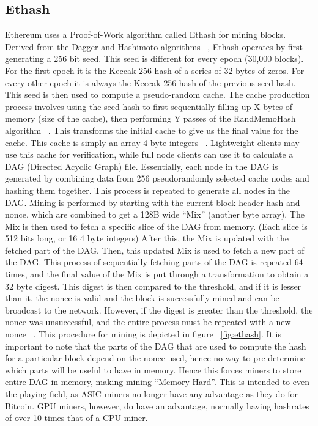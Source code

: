 \documentclass[10pt, conference, compsocconf]{IEEEtran}
\begin{document}
\subsection{Ethash}
Ethereum uses a Proof-of-Work algorithm called Ethash for mining blocks. Derived from the Dagger and Hashimoto algorithms ~\cite{dagger-hashimoto}, Ethash operates by first generating a 256 bit seed. This seed is different for every epoch (30,000 blocks). For the first epoch it is the Keccak-256 hash of a series of 32 bytes of zeros. For every other epoch it is always the Keccak-256 hash of the previous seed hash. This seed is then used to compute a pseudo-random cache. The cache production process involves using the seed hash to first sequentially filling up X bytes of memory (size of the cache), then performing Y passes of the RandMemoHash algorithm ~\cite{randmemohash}. This transforms the initial cache to give us the final value for the cache. This cache is simply an array 4 byte integers ~\cite{Ethmining}. Lightweight clients may use this cache for verification, while full node clients can use it to calculate a DAG (Directed Acyclic Graph) file. Essentially, each node in the DAG is generated by combining data from 256 pseudorandomly selected cache nodes and hashing them together. This process is repeated to generate all nodes in the DAG. Mining is performed by starting with the current block header hash and nonce, which are combined to get a 128B wide ``Mix'' (another byte array). The Mix is then used to fetch a specific slice of the DAG from memory. (Each slice is 512 bits long, or 16 4 byte integers) After this, the Mix is updated with the fetched part of the DAG. Then, this updated Mix is used to fetch a new part of the DAG. This process of sequentially fetching parts of the DAG is repeated 64 times, and the final value of the Mix is put through a transformation to obtain a 32 byte digest. This digest is then compared to the threshold, and if it is lesser than it, the nonce is valid and the block is successfully mined and can be broadcast to the network. However, if the digest is greater than the threshold, the nonce was unsuccessful, and the entire process must be repeated with a new nonce ~\cite{Ethmining}. This procedure for mining is depicted in figure ~\ref{fig:ethash}. It is important to note that the parts of the DAG that are used to compute the hash for a particular block depend on the nonce used, hence no way to pre-determine which parts will be useful to have in memory. Hence this forces miners to store entire DAG in memory, making mining ``Memory Hard''. This is intended to even the playing field, as ASIC miners no longer have any advantage as they do for Bitcoin. GPU miners, however, do have an advantage, normally having hashrates of over 10 times that of a CPU miner.
\end{document}
